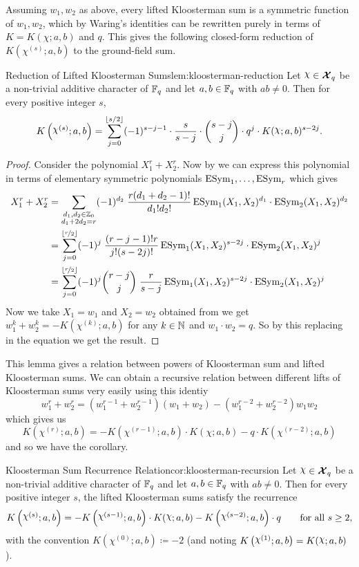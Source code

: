 Assuming $w_1,w_2$ as above, every lifted Kloosterman sum is a symmetric function of $w_1,w_2$, which by Waring's identities can be rewritten purely in terms of $K=K(\chi;a,b)$ and $q$. This gives the following closed-form reduction of $K(\chi^{(s)};a,b)$ to the ground-field sum.
\begin{lemma}{Reduction of Lifted Kloosterman Sums}{lem:kloosterman-reduction}
  Let $\chi\in\Xq$ be a non-trivial additive character of $\mathbb{F}_q$ and let $a,b\in\mathbb{F}_q$ with $ab\neq 0$. Then for every positive integer $s$,
  $$K\lt(\chi^{(s)};a,b\rt)=\sum_{j=0}^{\lfloor s/2\rfloor}(-1)^{s-j-1}\cdot \frac{s}{s-j}\cdot \binom{s-j}{j}\cdot q^j\cdot K(\chi;a,b)^{s-2j}.$$
\end{lemma}
\begin{proof}
  Consider the polynomial $X_1^r+X_2^r$. Now by \Waringthm we can express this polynomial in terms of elementary symmetric polynomials $\operatorname{ESym}_1,\dots, \operatorname{ESym}_r$ which gives \begin{align*}
    X_1^r+X_2^r& = \sum_{\substack{d_1,d_2\in\mathbb{Z}_0\\ d_1+2d_2=r}}(-1)^{d_2}\;\frac{r(d_1+d_2-1)!}{d_1!d_2!}\operatorname{ESym}_1(X_1,X_2)^{d_1}\cdot \operatorname{ESym}_2(X_1,X_2)^{d_2}\\ 
    & = \sum_{j=0}^{\lfloor\nicefrac{r}{2}\rfloor}(-1)^j \;\frac{(r-j-1)!r}{j!(s-2j)!}\operatorname{ESym}_1(X_1,X_2)^{s-2j}\cdot \operatorname{ESym}_2(X_1,X_2)^j\\ 
    & = \sum_{j=0}^{\lfloor\nicefrac{r}{2}\rfloor}(-1)^j \binom{r-j}{j}\;\frac{r}{s-j}\operatorname{ESym}_1(X_1,X_2)^{s-2j}\cdot \operatorname{ESym}_2(X_1,X_2)^j
  \end{align*}
  Now we take $X_1=w_1$ and $X_2=w_2$ obtained from  we get $w_1^k+w_2^k=-K(\chi^{(k)};a,b)$ for any $k\in\mathbb{N}$ and $w_1\cdot w_2=q$. So by this replacing in the equation we get the result. 
\end{proof}
This lemma gives a relation between powers of Kloosterman sum and lifted Kloosterman sums. We can obtain a recursive relation between different lifts of Kloosterman sums very easily using this identiy$$w_1^r+w_2^r=(w_1^{r-1}+w_2^{r-1})(w_1+w_2)-(w_1^{r-2}+w_2^{r-2})w_1w_2$$ which gives us $$K(\chi^{(r)};a,b)=-K(\chi^{(r-1)};a,b)\cdot K(\chi;a,b)-q\cdot K(\chi^{(r-2)};a,b)$$ and so we have the corollary. 
\begin{corolary}{Kloosterman Sum Recurrence Relation}{cor:kloosterman-recursion}
  Let $\chi\in\Xq$ be a non-trivial additive character of $\mathbb{F}_q$ and let $a,b\in\mathbb{F}_q$ with $ab\neq 0$. Then for every positive integer $s$, the lifted Kloosterman sums satisfy the recurrence $$K\lt(\chi^{(s)};a,b\rt)=-K\lt(\chi^{(s-1)};a,b\rt)\cdot K(\chi;a,b)-K\lt(\chi^{(s-2)};a,b\rt)\cdot q\qquad \text{for all }s\geq 2,$$ with the convention $K(\chi^{(0)};a,b)\coloneqq -2$ (and noting $K\lt(\chi^{(1)};a,b\rt)=K(\chi;a,b)$).
\end{corolary}
